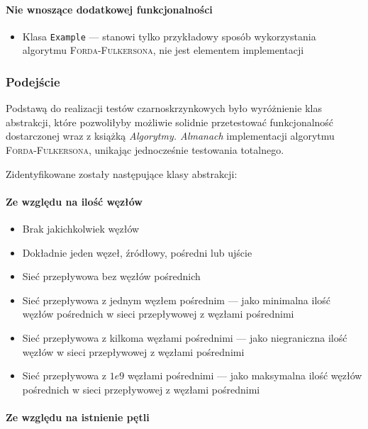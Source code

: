 \begin{itemize}[nosep]
\paragraph{Nie wnoszące dodatkowej funkcjonalności}
\begin{itemize}[nosep]
    \item Klasa \texttt{Example} --- stanowi tylko przykładowy sposób wykorzystania algorytmu \textsc{Forda-Fulkersona}, nie jest elementem implementacji%
\end{itemize}

\subsubsection{Podejście}%
Podstawą do realizacji testów czarno\dywiz skrzynkowych było wyróżnienie klas abstrakcji, które pozwoliłyby możliwie solidnie przetestować funkcjonalność dostarczonej wraz z książką \emph{Algorytmy. Almanach} implementacji algorytmu \textsc{Forda-Fulkersona}, unikając jednocześnie testowania totalnego.

Zidentyfikowane zostały następujące klasy abstrakcji:

\paragraph{Ze względu na ilość węzłów}
\begin{itemize}[nosep]
    \item Brak jakichkolwiek węzłów
    \item Dokładnie jeden węzeł, źródłowy, pośredni lub ujście
    \item Sieć przepływowa bez węzłów pośrednich
    \item Sieć przepływowa z jednym węzłem pośrednim --- jako minimalna ilość węzłów pośrednich w sieci przepływowej z węzłami pośrednimi
    \item Sieć przepływowa z kilkoma węzłami pośrednimi --- jako niegraniczna ilość węzłów w sieci przepływowej z węzłami pośrednimi
    \item Sieć przepływowa z $1e9$ węzłami pośrednimi --- jako maksymalna ilość węzłów pośrednich w sieci przepływowej z węzłami pośrednimi
\end{itemize}

\paragraph{Ze względu na istnienie pętli}
\begin{itemize}[nosep]


\end{itemize}
\end{itemize}
